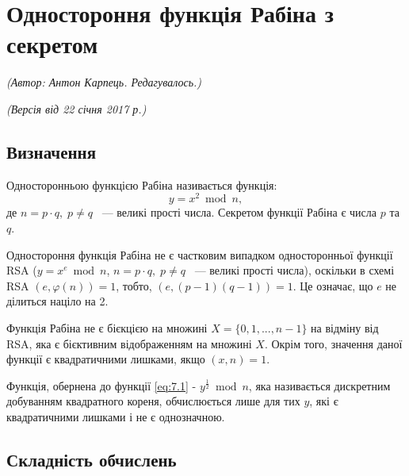 \section{Одностороння функція Рабіна з секретом}
\begin{flushright}
\emph{(Автор: Антон Карпець.  Редагувалось.)}
\par \emph{(Версія від 22 січня 2017 р.)}
\end{flushright}

\subsection{Визначення}

\begin{mydef}
Односторонньою функцією Рабіна називається функція: 
\begin{equation} \label{eq:7.1}
y = x ^{2} \bmod n,
\end{equation}
де $n = p \cdot q,\; p \neq q$ ~--- великі прості числа. Секретом функції Рабіна є числа $p$ та $q$.
\end{mydef}

\begin{remark}
Одностороння функція Рабіна не є частковим випадком односторонньої функції RSA ($y = x ^{e} \bmod n$,
$n = p \cdot q,\; p \neq q$ ~--- великі прості числа), оскільки в схемі RSA $(e, \varphi(n)) = 1$, тобто, $(e, (p-1)(q-1)) = 1$. Це означає, що $e$ не ділиться націло на 2.
\end{remark}

\begin{remark}
Функція Рабіна не є бієкцією на множині $X = \{ 0, 1, ..., n-1 \}$ на відміну від RSA, яка є бієктивним відображенням на множині $X$. Окрім того, значення даної функції є квадратичними лишками, якщо $(x, n) = 1$.
\end{remark}

\begin{remark}
Функція, обернена до функції \eqref{eq:7.1} - $y ^{\frac{1}{2}} \bmod n$, яка називається дискретним добуванням квадратного кореня, обчислюється лише для тих $y$, які є квадратичними лишками і не є однозначною.
\end{remark}

\subsection{Складність обчислень}

